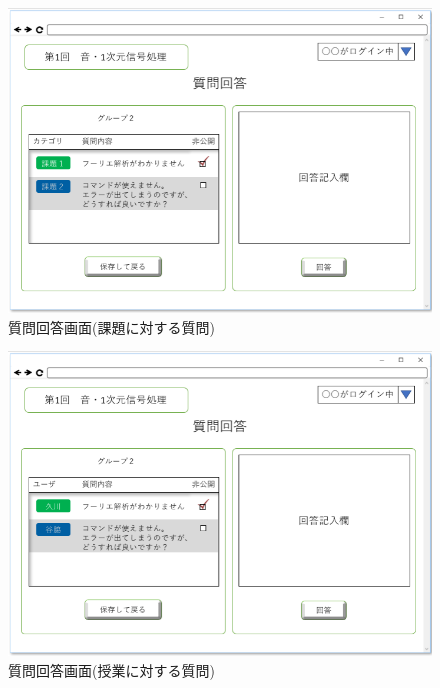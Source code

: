 \begin{figure}[phtbp]
  \begin{center}
    \includegraphics[width=1\linewidth,clip]{./img/24.png}
    \caption{質問回答画面(課題に対する質問)}\label{fig:24}
  \end{center}
\end{figure}

\begin{figure}[phtbp]
  \begin{center}
    \includegraphics[width=1\linewidth,clip]{./img/25.png}
    \caption{質問回答画面(授業に対する質問)}\label{fig:25}
  \end{center}
\end{figure}

\newpage

